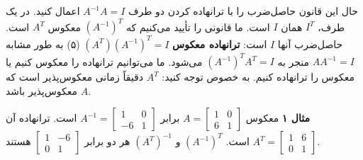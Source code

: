 \documentclass[12pt, a4paper]{book}
\begin{document}
	حال این قانون حاصل‌ضرب را با ترانهاده کردن دو طرف $A^{-1}A=I$ اعمال کنید. در یک طرف، $I^T$ همان $I$ است. ما قانونی را تأیید می‌کنیم که $(A^{-1})^T$ معکوس $A^T$ است. حاصل‌ضرب آنها $I$ است:
	\textbf{ترانهاده معکوس} \quad $(A^T)(A^{-1})^T = I$ \quad (۵)
	به طور مشابه $AA^{-1}=I$ منجر به $(A^{-1})^TA^T=I$ می‌شود. ما می‌توانیم ترانهاده را معکوس کنیم یا معکوس را ترانهاده کنیم. به خصوص توجه کنید: $A^T$ دقیقاً زمانی معکوس‌پذیر است که $A$ معکوس‌پذیر باشد.
	
	\textbf{مثال ۱}
	معکوس $A = \begin{bmatrix} 1 & 0 \\ 6 & 1 \end{bmatrix}$ برابر $A^{-1} = \begin{bmatrix} 1 & 0 \\ -6 & 1 \end{bmatrix}$ است. ترانهاده آن $A^T = \begin{bmatrix} 1 & 6 \\ 0 & 1 \end{bmatrix}$ است.
	$(A^{-1})^T$ و $(A^T)^{-1}$ هر دو برابر $\begin{bmatrix} 1 & -6 \\ 0 & 1 \end{bmatrix}$ هستند.
	
\end{document}
